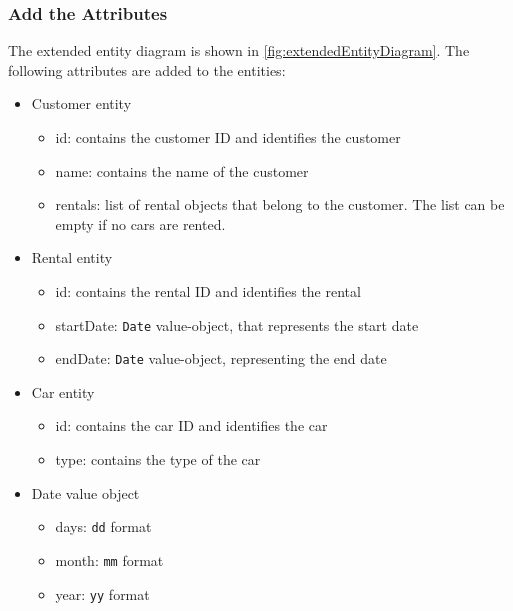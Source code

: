 \subsubsection*{Add the Attributes}
The extended entity diagram is shown in \autoref{fig:extendedEntityDiagram}.
The following attributes are added to the entities:
\begin{itemize}
    \item Customer entity
    \begin{itemize}
        \item id: contains the customer ID and identifies the customer
        \item name: contains the name of the customer
        \item rentals: list of rental objects that belong to the customer. The list can be empty if no cars are rented.
    \end{itemize}
    \item Rental entity
    \begin{itemize}
        \item id: contains the rental ID and identifies the rental
        \item startDate: \texttt{Date} value-object, that represents the start date
        \item endDate: \texttt{Date} value-object, representing the end date
    \end{itemize}
    \item Car entity
    \begin{itemize}
        \item id: contains the car ID and identifies the car
        \item type: contains the type of the car
    \end{itemize}
    \item Date value object
    \begin{itemize}
        \item days: \texttt{dd} format
        \item month: \texttt{mm} format
        \item year: \texttt{yy} format
    \end{itemize}
\end{itemize}

